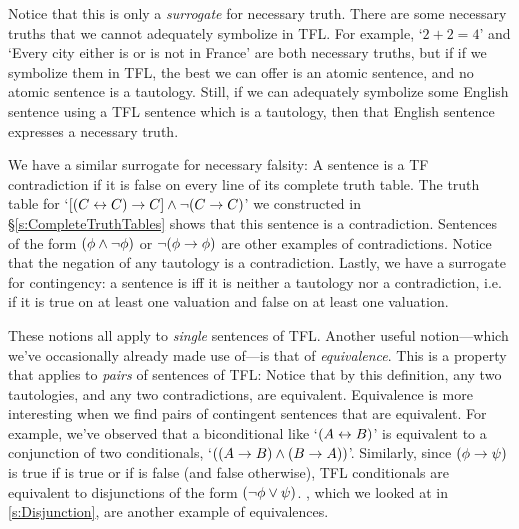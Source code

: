 Notice that this is only a \emph{surrogate} for necessary truth. There are some necessary truths that we cannot adequately symbolize in TFL. For example, `$2 + 2 = 4$' and `Every city either is or is not in France' are both necessary truths, but if if we symbolize them in TFL, the best we can offer is an atomic sentence, and no atomic sentence is a tautology. Still, if we can adequately symbolize some English sentence using a TFL sentence which is a tautology, then that English sentence expresses a necessary truth.

We have a similar surrogate for necessary falsity:
A sentence is a TF contradiction if it is false on every line of its complete truth table. The truth table for `$[(C\leftrightarrow C) \rightarrow C] \wedge \neg(C \rightarrow C)$' we constructed in \S\ref{s:CompleteTruthTables} shows that this sentence is a contradiction.  Sentences of the form $(\mathcal{\phi} \wedge \neg \mathcal{\phi})$ or $\neg(\mathcal{\phi} \rightarrow \mathcal{\phi})$ are other examples of contradictions.  Notice that the negation of any tautology is a contradiction.  Lastly, we have a surrogate for contingency: a sentence \meta{\phi} is  iff it is neither a tautology nor a contradiction, i.e. if it is true on at least one valuation and false on at least one valuation.

These notions all apply to \emph{single} sentences of TFL.  Another useful notion---which we've occasionally already made use of---is that of \emph{equivalence}.  This is a property that applies to \emph{pairs} of sentences of TFL:
Notice that by this definition, any two tautologies, and any two contradictions, are equivalent.  Equivalence is more interesting when we find pairs of contingent sentences that are equivalent.  For example, we've observed that a biconditional like `$(A \leftrightarrow B)$' is equivalent to a conjunction of two conditionals, `$((A \rightarrow B) \wedge (B \rightarrow A))$'.  Similarly, since $(\mathcal{\phi} \rightarrow \mathcal{\psi})$ is true if  \meta{\phi} is true or if \meta{\psi} is false (and false otherwise),  TFL conditionals are equivalent to disjunctions of the form $(\neg \mathcal{\phi} \vee \mathcal{\psi})$.  , which we looked at in \ref{s:Disjunction}, are another example of equivalences.

